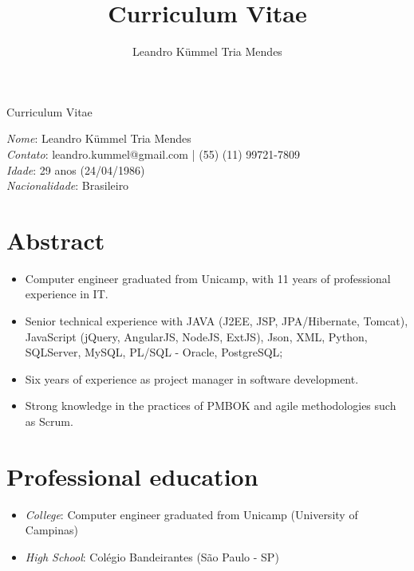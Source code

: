 \documentclass[a4paper,11pt]{article}
\title{Curriculum Vitae}
\author{Leandro Kümmel Tria Mendes}
\begin{document}
\begin{center} 
Curriculum Vitae
\end{center} 
\emph{Nome}: Leandro Kümmel Tria Mendes\\
\emph{Contato}: leandro.kummel@gmail.com | (55) (11) 99721-7809\\
\emph{Idade}: 29 anos (24/04/1986)\\
\emph{Nacionalidade}: Brasileiro\\
\section{Abstract}
\begin{itemize}
\item Computer engineer graduated from Unicamp, with 11 years of professional experience in IT.
\item Senior technical experience with JAVA (J2EE, JSP, JPA/Hibernate, Tomcat), JavaScript (jQuery, AngularJS, NodeJS, ExtJS), Json, XML, Python, SQLServer, MySQL, PL/SQL - Oracle, PostgreSQL;
\item Six years of experience as project manager in software development.
\item Strong knowledge in the practices of PMBOK and agile methodologies such as Scrum.
\end{itemize}

\section{Professional education}
\begin{itemize}
\item \emph{College}: Computer engineer graduated from Unicamp (University of Campinas)
\item \emph{High School}: Colégio Bandeirantes (São Paulo - SP)

\end{itemize}
\end{document}
